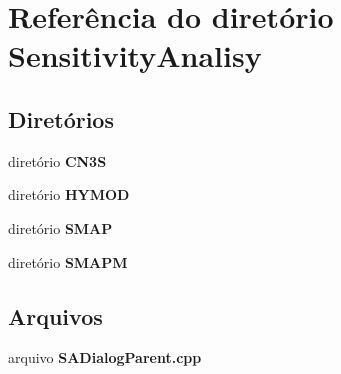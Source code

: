 \section{Referência do diretório Sensitivity\+Analisy}
\label{dir_0f4d0bfa2c0841a2093c79d1f2d35c13}
\subsection*{Diretórios}
\begin{DoxyCompactItemize}
\item 
diretório {\bf C\+N3S}
\item 
diretório {\bf H\+Y\+M\+OD}
\item 
diretório {\bf S\+M\+AP}
\item 
diretório {\bf S\+M\+A\+PM}
\end{DoxyCompactItemize}
\subsection*{Arquivos}
\begin{DoxyCompactItemize}
\item 
arquivo {\bf S\+A\+Dialog\+Parent.\+cpp}
\end{DoxyCompactItemize}
